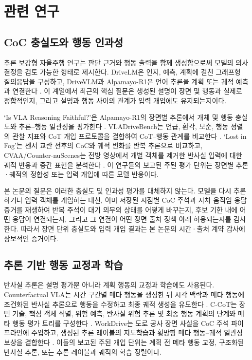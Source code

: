 \section{관련 연구}
\label{sec:related}

\subsection{CoC 충실도와 행동 인과성}
추론 보강형 자율주행 연구는 판단 근거와 행동 출력을 함께 생성함으로써 모델의 의사결정을 검토 가능한 형태로 제시한다. DriveLM은 인지, 예측, 계획에 걸친 그래프형 질의응답을 구성하고, DriveVLM과 Alpamayo-R1은 언어 추론을 계획 또는 궤적 예측과 연결한다 \cite{sima2024drivelm,tian2024drivevlm,wang2025alpamayo}. 이 계열에서 최근의 핵심 질문은 생성된 설명이 장면 및 행동과 실제로 정합적인지, 그리고 설명과 행동 사이의 관계가 입력 개입에도 유지되는지이다.

`Is VLA Reasoning Faithful?'은 Alpamayo-R1의 장면별 추론에서 개체 및 행동 충실도와 추론--행동 일관성을 평가한다 \cite{mayumu2026faithfulness}. VLADriveBench는 언급, 환각, 모순, 행동 정렬의 관찰 지표와 CoT 개입 프로토콜을 결합하여 CoT--행동 관계를 비교한다 \cite{nguyen2026vladrivebench}. `Lost in Fog'는 센서 교란 전후의 CoC와 궤적 변화를 반복 추론으로 비교하고, CVAA/Counter-nuScenes는 전방 영상에서 개별 객체를 제거한 반사실 입력에 대한 궤적 반응과 중간 표현을 분석한다 \cite{priyadershi2026lostinfog,panda2026cvaa}. 이 연구들의 보고된 주된 평가 단위는 장면별 추론·궤적의 정합성 또는 입력 개입에 따른 모델 반응이다.

본 논문의 질문은 이러한 충실도 및 인과성 평가를 대체하지 않는다. 모델을 다시 추론하거나 입력 객체를 개입하는 대신, 이미 저장된 시점별 CoC 주석과 자차 움직임 응답 증거를 재생하여 반복 주석이 대기 의무의 상태를 어떻게 바꾸는지, 후보 기한 내에 어떤 응답이 연결되는지, 그리고 그 연결이 어떤 장면 출처 정책 아래 허용되는지를 감사한다. 따라서 장면 단위 충실도와 입력 개입 결과는 본 논문의 시간·출처 계약 감사에 상보적인 증거이다.

\subsection{추론 기반 행동 교정과 학습}
반사실 추론은 설명 평가뿐 아니라 계획 행동의 교정과 학습에도 사용된다. Counterfactual VLA는 시간 구간별 메타 행동을 생성한 뒤 시각 맥락과 메타 행동에 조건화된 반사실 추론으로 행동을 수정하고 최종 궤적 생성을 유도한다 \cite{peng2025counterfactualvla}. C-CoT는 장면 기술, 핵심 객체 식별, 위험 예측, 반사실 위험 추론 및 최종 행동 계획의 단계와 메타 행동 평가 트리를 구성한다 \cite{tian2026ccot}. WorkDrive는 도로 공사 장면 사실을 CoC 주석 파이프라인에 주입하고, 생성된 추론 레이블의 지도학습과 횡방향 메타 행동--궤적 일관성 보상을 결합한다 \cite{jiang2026workdrive}. 이들의 보고된 주된 개입 단위는 계획 전 메타 행동 교정, 구조화된 반사실 추론, 또는 추론 레이블과 궤적의 학습 정렬이다.

